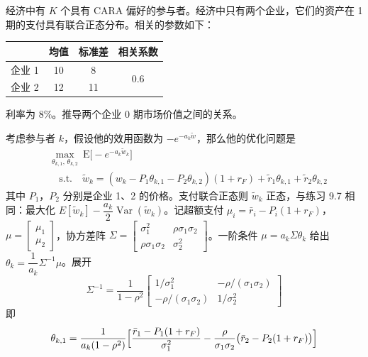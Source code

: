 \begin{problem}
 经济中有 $K$ 个具有 CARA 偏好的参与者。经济中只有两个企业，它们的资产在 1 期的支付具有联合正态分布。相关的参数如下：
\begin{center}
\begin{tabular}{lccc}
    \toprule
     & 均值 & 标准差 & 相关系数 \\
    \midrule
    企业 1 & 10 & 8 & \multirow{2}{*}{0.6} \\
    企业 2 & 12 & 11 & \\
    \bottomrule
\end{tabular}
\end{center}
利率为 $8\%$。推导两个企业 0 期市场价值之间的关系。
\end{problem}
\begin{solution}
考虑参与者 $k$，假设他的效用函数为 $-e^{-a_{k}\tilde{w}}$，那么他的优化问题是
\[
    \begin{aligned}
        &\max_{\theta_{k,1},\,\theta_{k,2}}\ \mathrm{E}\bigl[-e^{-a_{k}\tilde{w}_{k}}\bigr]\\
        &\quad\text{s.t.}\quad \tilde{w}_{k}=(w_{k}-P_{1}\theta_{k,1}-P_{2}\theta_{k,2})(1+r_{F})+\tilde{r}_{1}\theta_{k,1}+\tilde{r}_{2}\theta_{k,2}
    \end{aligned}
\]
其中 $P_{1}$，$P_{2}$ 分别是企业 1、2 的价格。支付联合正态则 $\tilde{w}_{k}$ 正态，与练习 9.7 相同：最大化 $E[\tilde{w}_{k}]-\dfrac{a_{k}}{2}\operatorname{Var}(\tilde{w}_{k})$。记超额支付 $\mu_{i}=\bar{r}_{i}-P_{i}(1+r_{F})$，$\mu=\begin{bmatrix}\mu_{1}\\\mu_{2}\end{bmatrix}$，协方差阵 $\Sigma=\begin{bmatrix}\sigma_{1}^{2}&\rho\sigma_{1}\sigma_{2}\\\rho\sigma_{1}\sigma_{2}&\sigma_{2}^{2}\end{bmatrix}$。一阶条件 $\mu=a_{k}\Sigma\theta_{k}$ 给出 $\theta_{k}=\dfrac{1}{a_{k}}\Sigma^{-1}\mu$。展开
\[
    \Sigma^{-1}=\frac{1}{1-\rho^{2}}\begin{bmatrix}1/\sigma_{1}^{2}&-\rho/(\sigma_{1}\sigma_{2})\\-\rho/(\sigma_{1}\sigma_{2})&1/\sigma_{2}^{2}\end{bmatrix}
\]
即
\[
    \begin{aligned}
        \theta_{k,1}&=\frac{1}{a_{k}(1-\rho^{2})}\Bigl[\frac{\bar{r}_{1}-P_{1}(1+r_{F})}{\sigma_{1}^{2}}-\frac{\rho}{\sigma_{1}\sigma_{2}}\bigl(\bar{r}_{2}-P_{2}(1+r_{F})\bigr)\Bigr]\\

\end{aligned}\]
\end{solution}
